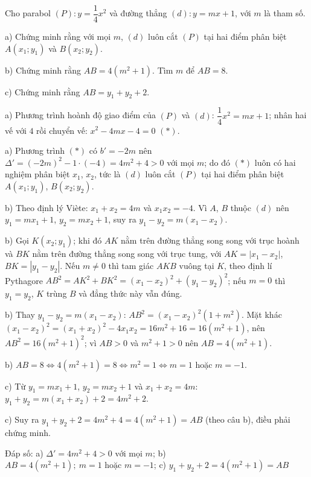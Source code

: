 \begin{problem}[9DS-HSB2-020]
Cho parabol $(P)\colon y = \dfrac{1}{4}x^2$ và đường thẳng $(d)\colon y = mx + 1$, với $m$ là tham số.

a) Chứng minh rằng với mọi $m$, $(d)$ luôn cắt $(P)$ tại hai điểm phân biệt $A(x_1; y_1)$ và $B(x_2; y_2)$.

b) Chứng minh rằng $AB = 4(m^2 + 1)$. Tìm $m$ để $AB = 8$.

c) Chứng minh rằng $AB = y_1 + y_2 + 2$.

\begin{solution}
a) Phương trình hoành độ giao điểm của $(P)$ và $(d)$: $\dfrac{1}{4}x^2 = mx + 1$; nhân hai vế với $4$ rồi chuyển vế: $x^2 - 4mx - 4 = 0$ $(*)$.

a) Phương trình $(*)$ có $b' = -2m$ nên $\Delta' = (-2m)^2 - 1 \cdot (-4) = 4m^2 + 4 > 0$ với mọi $m$; do đó $(*)$ luôn có hai nghiệm phân biệt $x_1$, $x_2$, tức là $(d)$ luôn cắt $(P)$ tại hai điểm phân biệt $A(x_1; y_1)$, $B(x_2; y_2)$.

b) Theo định lý Viète: $x_1 + x_2 = 4m$ và $x_1x_2 = -4$. Vì $A$, $B$ thuộc $(d)$ nên $y_1 = mx_1 + 1$, $y_2 = mx_2 + 1$, suy ra $y_1 - y_2 = m(x_1 - x_2)$.

b) Gọi $K(x_2; y_1)$; khi đó $AK$ nằm trên đường thẳng song song với trục hoành và $BK$ nằm trên đường thẳng song song với trục tung, với $AK = |x_1 - x_2|$, $BK = |y_1 - y_2|$. Nếu $m \neq 0$ thì tam giác $AKB$ vuông tại $K$, theo định lí Pythagore $AB^2 = AK^2 + BK^2 = (x_1 - x_2)^2 + (y_1 - y_2)^2$; nếu $m = 0$ thì $y_1 = y_2$, $K$ trùng $B$ và đẳng thức này vẫn đúng.

b) Thay $y_1 - y_2 = m(x_1 - x_2)$: $AB^2 = (x_1 - x_2)^2(1 + m^2)$. Mặt khác $(x_1 - x_2)^2 = (x_1 + x_2)^2 - 4x_1x_2 = 16m^2 + 16 = 16(m^2 + 1)$, nên $AB^2 = 16(m^2 + 1)^2$; vì $AB > 0$ và $m^2 + 1 > 0$ nên $AB = 4(m^2 + 1)$.

b) $AB = 8 \Leftrightarrow 4(m^2 + 1) = 8 \Leftrightarrow m^2 = 1 \Leftrightarrow m = 1$ hoặc $m = -1$.

c) Từ $y_1 = mx_1 + 1$, $y_2 = mx_2 + 1$ và $x_1 + x_2 = 4m$: $y_1 + y_2 = m(x_1 + x_2) + 2 = 4m^2 + 2$.

c) Suy ra $y_1 + y_2 + 2 = 4m^2 + 4 = 4(m^2 + 1) = AB$ (theo câu b), điều phải chứng minh.

Đáp số: a) $\boxed{\Delta' = 4m^2 + 4 > 0 \text{ với mọi } m}$; b) $\boxed{AB = 4(m^2 + 1);\ m = 1 \text{ hoặc } m = -1}$; c) $\boxed{y_1 + y_2 + 2 = 4(m^2 + 1) = AB}$
\end{solution}
\end{problem}

